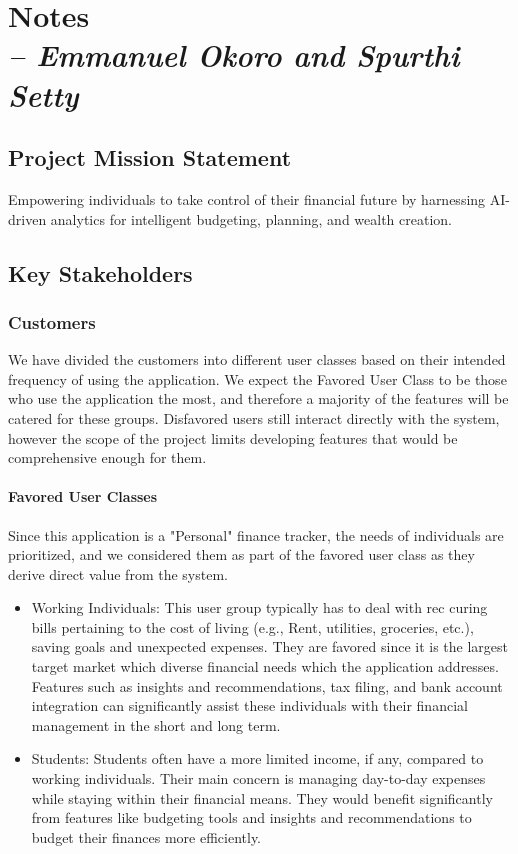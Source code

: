 \chapter{Notes \\
\small{\textit{-- Emmanuel Okoro and Spurthi Setty}}
\label{Chapter::Notes}}

\section{Project Mission Statement}
Empowering individuals to take control of their financial future by harnessing AI-driven analytics for intelligent budgeting, planning, and wealth creation.

\section{Key Stakeholders}
\subsection{Customers}
We have divided the customers into different user classes based on their intended frequency of using the application. We expect the Favored User Class to be those who use the application the most, and therefore a majority of the features will be catered for these groups. Disfavored users still interact directly with the system, however the scope of the project limits developing features that would be comprehensive enough for them. 

\subsubsection{Favored User Classes}
Since this application is a "Personal" finance tracker, the needs of individuals are prioritized, and we considered them as part of the favored user class as they derive direct value from the system. 

\begin{itemize}
    \item Working Individuals: This user group typically has to deal with rec curing bills pertaining to the cost of living (e.g., Rent, utilities, groceries, etc.), saving goals and unexpected expenses. They are favored since it is the largest target market which diverse financial needs which the application addresses. Features such as insights and recommendations, tax filing, and bank account integration can significantly assist these individuals with their financial management in the short and long term. 
    
    \item Students: Students often have a more limited income, if any, compared to working individuals. Their main concern is managing day-to-day expenses while staying within their financial means. They would benefit significantly from features like budgeting tools and insights and recommendations to budget their finances more efficiently. 
\end{itemize}
